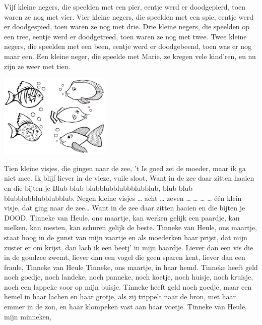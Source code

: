 \documentclass{article}
\begin{document}
\begin{songs}{}
Vijf kleine negers,
die speelden met een pier,
eentje werd er doodgepierd,
toen waren ze nog met vier.
\endverse
\beginverse*
Vier kleine negers,
die speelden met een spie,
eentje werd er doodgespied,
toen waren ze nog met drie.
\endverse
\beginverse*
Drie kleine negers,
die speelden op een tree,
eentje werd er doodgetreed,
toen waren ze nog met twee.
\endverse
\beginverse*
Twee kleine negers,
die speelden met een been,
eentje werd er doodgebeend,
toen was er nog maar een.
\endverse
\beginverse*
Een kleine neger,
die speelde met Marie,
ze kregen vele kind'ren,
en nu zijn ze weer met tien.
\endverse
\endsong
\begin{intersong}
    \includegraphics[width=0.4\textwidth]{tienkleinevisjes}
\end{intersong}
\beginverse*
Tien kleine visjes, die gingen naar de zee,
't Is goed zei de moeder, maar ik ga niet mee. 
Ik blijf liever in de vieze, vuile sloot,
Want in de zee daar zitten haaien en die bijten je
Blub blub blubblubblubbblubblub, blub blub blubblubblubblubblub.
\endverse
\beginverse*
Negen kleine visjes … acht … zeven … … … …
\endverse
\beginverse*
één klein visje, dat ging naar de zee…
Want in de zee daar zitten haaien en die bijten je DOOD. 
\endverse
\endsong
{}
\beginverse*
Tinneke van Heule, ons maartje,
kan werken gelijk een paardje,
kan melken, kan mesten,
kan schuren gelijk de beste.
Tinneke van Heule, ons maartje,
staat hoog in de gunst van mijn vaartje
en als moederken haar prijst, dat mijn zuster er om krijst,
dan lach ik een beetj’ in mijn baardje.
\endverse
\beginchorus
Liever dan een vis die in de goudzee zwemt,
liever dan een vogel die geen sparen kent,
liever dan een fraule, Tinneke van Heule
Tinneke, ons maartje, in haar hemd. 
\endchorus
\beginverse*
Tinneke heeft geld noch goedje, 
noch landeke, noch panneke, noch koetje,
noch huisje, noch kruisje,
noch een lappeke voor op mijn buisje.
Tinneke heeft geld noch goedje,
maar een hemel in haar lachen en haar grotje,
als zij trippelt naar de bron, met haar emmer in de zon,
en haar klompeken vast aan haar voetje.
\endverse
\beginverse*
Tinneke van Heule, mijn minneken,

\end{songs}
\end{document}
